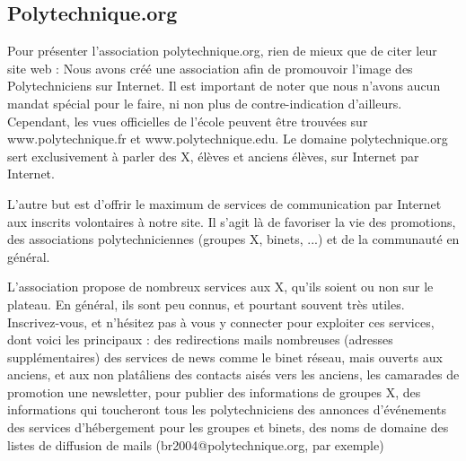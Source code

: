 \subsection{Polytechnique.org}
Pour pr\'esenter l'association polytechnique.org, rien de mieux que de citer leur site web :
  Nous avons cr\'e\'e une association afin de promouvoir l'image des Polytechniciens sur Internet.
  Il est important de noter que nous n'avons aucun mandat sp\'ecial pour le faire, ni non plus
  de contre-indication d'ailleurs. Cependant, les vues officielles de l'\'ecole peuvent \^etre
  trouv\'ees sur www.polytechnique.fr et www.polytechnique.edu. Le domaine polytechnique.org sert
  exclusivement \`a parler des X, \'el\`eves et anciens \'el\`eves, sur Internet par Internet.

  L'autre but est d'offrir le maximum de services de communication par Internet aux inscrits
  volontaires \`a notre site. Il s'agit l\`a de favoriser la vie des promotions, des associations
  polytechniciennes (groupes X, binets, ...) et de la communaut\'e en g\'en\'eral.

L'association propose de nombreux services aux X, qu'ils soient ou non sur le plateau.
En g\'en\'eral, ils sont peu connus, et pourtant souvent tr\`es utiles. Inscrivez-vous, et n'h\'esitez
pas \`a vous y connecter pour exploiter ces services, dont voici les principaux :
  des redirections mails nombreuses (adresses suppl\'ementaires)
  des services de news comme le binet r\'eseau, mais ouverts aux anciens, et aux non plat\^aliens
  des contacts ais\'es vers les anciens, les camarades de promotion
  une newsletter, pour publier des informations de groupes X, des informations qui toucheront tous les polytechniciens
  des annonces d'\'ev\'enements
  des services d'h\'ebergement pour les groupes et binets, des noms de domaine
  des listes de diffusion de mails (br2004@polytechnique.org, par exemple)
